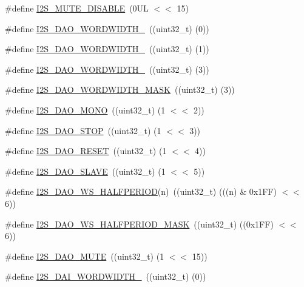 \begin{DoxyCompactItemize}
\#define \hyperlink{group___i2_s__18_x_x__43_x_x_ga7d6c53914dea99eecc1d59eefbdbf5aa}{I2\+S\+\_\+\+M\+U\+T\+E\+\_\+\+D\+I\+S\+A\+B\+LE}~(0\+U\+L $<$$<$ 15)
\item 
\#define \hyperlink{group___i2_s__18_x_x__43_x_x_ga9e390ef13bf52d00c311ca64d46c5ac2}{I2\+S\+\_\+\+D\+A\+O\+\_\+\+W\+O\+R\+D\+W\+I\+D\+T\+H\+\_}~((uint32\+\_\+t) (0))
\item 
\#define \hyperlink{group___i2_s__18_x_x__43_x_x_gaf48ba0298cdb6828567de0df29abcb4d}{I2\+S\+\_\+\+D\+A\+O\+\_\+\+W\+O\+R\+D\+W\+I\+D\+T\+H\+\_}~((uint32\+\_\+t) (1))
\item 
\#define \hyperlink{group___i2_s__18_x_x__43_x_x_gaa6666d92294cc244c41fd510fb7de31d}{I2\+S\+\_\+\+D\+A\+O\+\_\+\+W\+O\+R\+D\+W\+I\+D\+T\+H\+\_}~((uint32\+\_\+t) (3))
\item 
\#define \hyperlink{group___i2_s__18_x_x__43_x_x_ga47082bef68e91e6cedb9f819b8e2fa02}{I2\+S\+\_\+\+D\+A\+O\+\_\+\+W\+O\+R\+D\+W\+I\+D\+T\+H\+\_\+\+M\+A\+SK}~((uint32\+\_\+t) (3))
\item 
\#define \hyperlink{group___i2_s__18_x_x__43_x_x_gab32b25d6de6c9c964421ff08c1402e03}{I2\+S\+\_\+\+D\+A\+O\+\_\+\+M\+O\+NO}~((uint32\+\_\+t) (1 $<$$<$ 2))
\item 
\#define \hyperlink{group___i2_s__18_x_x__43_x_x_gaa8e56c2dab6e3206093dd6575332253d}{I2\+S\+\_\+\+D\+A\+O\+\_\+\+S\+T\+OP}~((uint32\+\_\+t) (1 $<$$<$ 3))
\item 
\#define \hyperlink{group___i2_s__18_x_x__43_x_x_ga7ec4a63719a45df4d30f42e03af0d9e6}{I2\+S\+\_\+\+D\+A\+O\+\_\+\+R\+E\+S\+ET}~((uint32\+\_\+t) (1 $<$$<$ 4))
\item 
\#define \hyperlink{group___i2_s__18_x_x__43_x_x_ga58ea023dda649de724684288e703ef86}{I2\+S\+\_\+\+D\+A\+O\+\_\+\+S\+L\+A\+VE}~((uint32\+\_\+t) (1 $<$$<$ 5))
\item 
\#define \hyperlink{group___i2_s__18_x_x__43_x_x_ga3bfda0af914736d2765822daee28a489}{I2\+S\+\_\+\+D\+A\+O\+\_\+\+W\+S\+\_\+\+H\+A\+L\+F\+P\+E\+R\+I\+OD}(n)~((uint32\+\_\+t) (((n) \& 0x1\+F\+F) $<$$<$ 6))
\item 
\#define \hyperlink{group___i2_s__18_x_x__43_x_x_gaf32d949b14558ee1aad72a765726731c}{I2\+S\+\_\+\+D\+A\+O\+\_\+\+W\+S\+\_\+\+H\+A\+L\+F\+P\+E\+R\+I\+O\+D\+\_\+\+M\+A\+SK}~((uint32\+\_\+t) ((0x1\+F\+F) $<$$<$ 6))
\item 
\#define \hyperlink{group___i2_s__18_x_x__43_x_x_ga78bd42c0693e2a68dcba79a4cc05b8d5}{I2\+S\+\_\+\+D\+A\+O\+\_\+\+M\+U\+TE}~((uint32\+\_\+t) (1 $<$$<$ 15))
\item 
\#define \hyperlink{group___i2_s__18_x_x__43_x_x_ga8bd50ada05c4cd981f07be7a3b1002dc}{I2\+S\+\_\+\+D\+A\+I\+\_\+\+W\+O\+R\+D\+W\+I\+D\+T\+H\+\_}~((uint32\+\_\+t) (0))

\end{DoxyCompactItemize}
